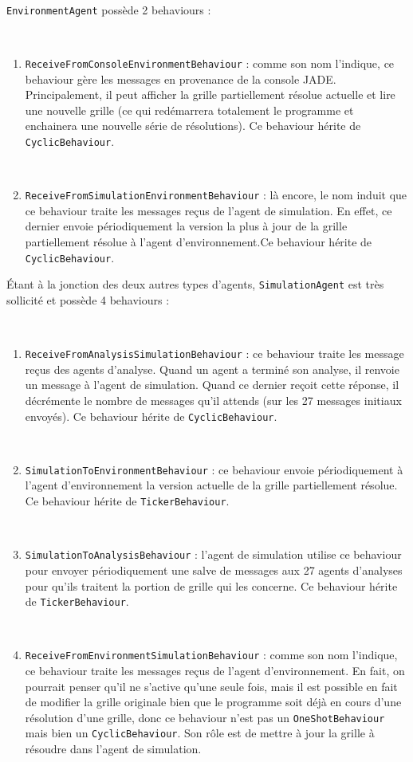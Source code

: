 \documentclass[11pt]{report}
\begin{document}
~\\
\verb|EnvironmentAgent| possède 2 behaviours : 

~\
\begin{enumerate}
\item \verb|ReceiveFromConsoleEnvironmentBehaviour| : comme son nom l'indique, ce behaviour gère les messages en provenance de la console JADE. Principalement, il peut afficher la grille partiellement résolue actuelle et lire une nouvelle grille (ce qui redémarrera totalement le programme et enchainera une nouvelle série de résolutions). Ce behaviour hérite de \verb|CyclicBehaviour|.

~\
\item \verb|ReceiveFromSimulationEnvironmentBehaviour| : là encore, le nom induit que ce behaviour traite les messages reçus de l'agent de simulation. En effet, ce dernier envoie périodiquement la version la plus à jour de la grille partiellement résolue à l'agent d'environnement.Ce behaviour hérite de \verb|CyclicBehaviour|.
\end{enumerate}

\newpage
\noindent
Étant à la jonction des deux autres types d'agents, \verb|SimulationAgent| est très sollicité et possède   4 behaviours : 

~\
\begin{enumerate}
\item \verb|ReceiveFromAnalysisSimulationBehaviour| : ce behaviour traite les message reçus des agents d'analyse. Quand un agent a terminé son analyse, il renvoie un message à l'agent de simulation. Quand ce dernier reçoit cette réponse, il décrémente le nombre de messages qu'il attends (sur les 27 messages initiaux envoyés). Ce behaviour hérite de \verb|CyclicBehaviour|.

~\
\item \verb|SimulationToEnvironmentBehaviour| : ce behaviour envoie périodiquement à l'agent d'environnement la version actuelle de la grille partiellement résolue. Ce behaviour hérite de \verb|TickerBehaviour|.

~\
\item \verb|SimulationToAnalysisBehaviour| : l'agent de simulation utilise ce behaviour pour envoyer périodiquement une salve de messages aux 27 agents d'analyses pour qu'ils traitent la portion de grille qui les concerne. Ce behaviour hérite de \verb|TickerBehaviour|.

~\
\item \verb|ReceiveFromEnvironmentSimulationBehaviour| : comme son nom l'indique, ce behaviour traite les messages reçus de l'agent d'environnement. En fait, on pourrait penser qu'il ne s'active qu'une seule fois, mais il est possible en fait de modifier la grille originale bien que le programme soit déjà en cours d'une résolution d'une grille, donc ce behaviour n'est pas un \verb|OneShotBehaviour| mais bien un \verb|CyclicBehaviour|. Son rôle est de mettre à jour la grille à résoudre dans l'agent de simulation.
\end{enumerate}
\end{document}
